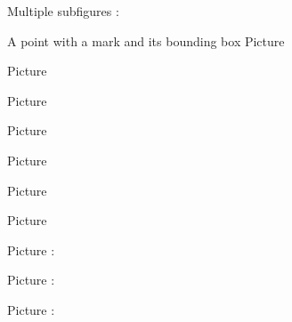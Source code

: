    \clearpage

Multiple subfigures :

A point with a mark and its bounding box
Picture 
\Huge
\begin{center}
   
\end{center}
\normalsize


Picture 
\begin{center}
   
\end{center}
   

Picture 
\begin{center}
   
\end{center}



Picture 
\begin{center}

\end{center}


Picture 
\begin{center}
   
\end{center}


Picture 
\begin{center}
   
\end{center}


Picture 
\begin{center}
   
\end{center}


Picture : 
\begin{center}
   
\end{center}
   


Picture : 
\begin{center}
   
\end{center}
   

Picture : 
\begin{center}
   
\end{center}

